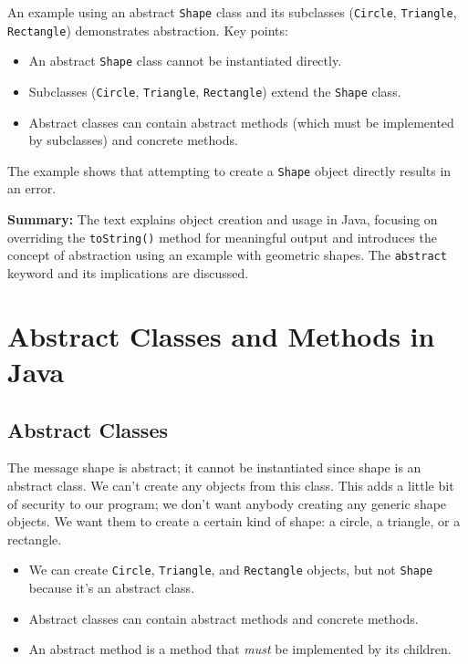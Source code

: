 \documentclass{article}
\begin{document}
An example using an abstract \texttt{Shape} class and its subclasses (\texttt{Circle}, \texttt{Triangle}, \texttt{Rectangle}) demonstrates abstraction.  Key points:

\begin{itemize}
    \item An abstract \texttt{Shape} class cannot be instantiated directly.
    \item Subclasses (\texttt{Circle}, \texttt{Triangle}, \texttt{Rectangle}) extend the \texttt{Shape} class.
    \item Abstract classes can contain abstract methods (which must be implemented by subclasses) and concrete methods.
\end{itemize}

The example shows that attempting to create a \texttt{Shape} object directly results in an error.


\textbf{Summary:} The text explains object creation and usage in Java, focusing on overriding the \texttt{toString()} method for meaningful output and introduces the concept of abstraction using an example with geometric shapes.  The \texttt{abstract} keyword and its implications are discussed.


\section{Abstract Classes and Methods in Java}

\subsection{Abstract Classes}

The message shape is abstract; it cannot be instantiated since shape is an abstract class. We can't create any objects from this class.  This adds a little bit of security to our program; we don't want anybody creating any generic shape objects. We want them to create a certain kind of shape: a circle, a triangle, or a rectangle.

\begin{itemize}
    \item We can create \texttt{Circle}, \texttt{Triangle}, and \texttt{Rectangle} objects, but not \texttt{Shape} because it's an abstract class.
    \item Abstract classes can contain abstract methods and concrete methods.
    \item An abstract method is a method that \textit{must} be implemented by its children.
\end{itemize}
\end{document}
